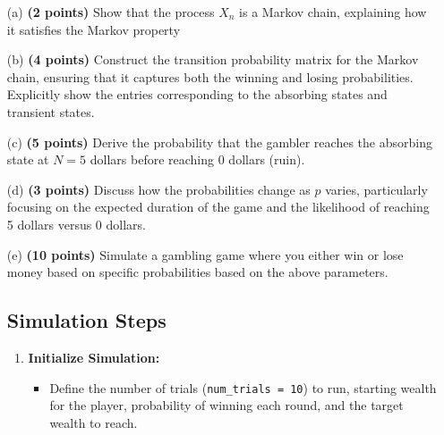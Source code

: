 \documentclass{article}
\begin{document}
\begin{itemize}
    \item[(a)] \textbf{(2 points)} Show that the process \( X_n \) is a Markov chain, explaining how it satisfies the Markov property 
    
    \item[(b)] \textbf{(4 points)} Construct the transition probability matrix for the Markov chain, ensuring that it captures both the winning and losing probabilities. Explicitly show the entries corresponding to the absorbing states and transient states.

    \item[(c)] \textbf{(5 points)} Derive the probability that the gambler reaches the absorbing state at \( N = 5 \) dollars before reaching 0 dollars (ruin).
    

    
    \item[(d)] \textbf{(3 points)} Discuss how the probabilities change as \( p \) varies, particularly focusing on the expected duration of the game and the likelihood of reaching 5 dollars versus 0 dollars.

    \item[(e)] \textbf{(10 points)} Simulate a gambling game where you either win or lose money based on specific probabilities based on the above parameters. 




\subsection*{Simulation Steps}

\begin{enumerate}
    
    \item \textbf{Initialize Simulation:}
    \begin{itemize}
        \item Define the number of trials (\texttt{num\_trials = 10}) to run, starting wealth for the player, probability of winning each round, and the target wealth to reach.
    \end{itemize}
    

\end{enumerate}
\end{itemize}
\end{document}
